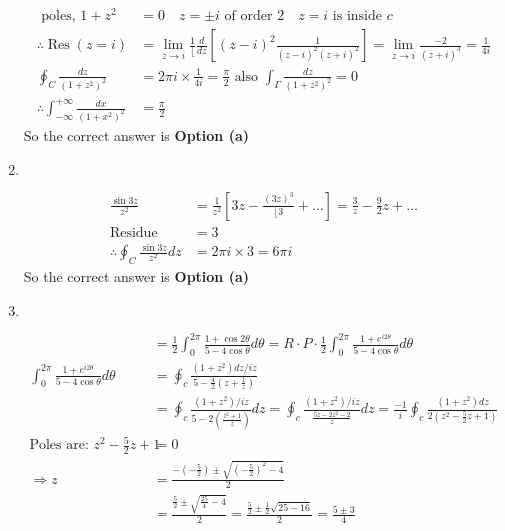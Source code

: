 \begin{enumerate}
\begin{answer}
\begin{align*}
	\text{	poles, }1+z^{2}&=0 \quad z=\pm i\text{ of order $2 \quad z=i$ is inside } c\\
	\therefore \operatorname{Res}(z=i)&=\lim _{z \rightarrow i} \frac{1}{\lfloor} \frac{d}{d z}\left[(z-i)^{2} \frac{1}{(z-i)^{2}(z+i)^{2}}\right]=\lim _{z \rightarrow i} \frac{-2}{(z+i)^{3}}=\frac{1}{4 i}\\
	\oint_{C} \frac{d z}{\left(1+z^{2}\right)^{2}}&=2 \pi i \times \frac{1}{4 i}=\frac{\pi}{2}\text{ also }\int_{\Gamma} \frac{d z}{\left(1+z^{2}\right)^{2}}=0\\
	\therefore \int_{-\infty}^{+\infty} \frac{d x}{\left(1+x^{2}\right)^{2}}&=\frac{\pi}{2}
	\end{align*}
	So the correct answer is \textbf{Option (a)}
\end{answer}
\item $\left. \right. $
\begin{answer}
	\begin{align*}
	\frac{\sin 3 z}{z^{2}}&=\frac{1}{z^{2}}\left[3 z-\frac{(3 z)^{3}}{\lfloor 3}+\ldots\right]=\frac{3}{z}-\frac{9}{2} z+\ldots\\
	\text{Residue }&=3\\
	\therefore \oint_{C} \frac{\sin 3 z}{z^{2}} d z&=2 \pi i \times 3=6 \pi i
	\end{align*}
	So the correct answer is \textbf{Option (a)}
\end{answer}
\item $\left. \right. $
\begin{answer}
	\begin{align*}
	&=\frac{1}{2} \int_{0}^{2 \pi} \frac{1+\cos 2 \theta}{5-4 \cos \theta} d \theta=R \cdot P \cdot \frac{1}{2} \int_{0}^{2 \pi} \frac{1+e^{i 2 \theta}}{5-4 \cos \theta} d \theta\\
	\int_{0}^{2 \pi} \frac{1+e^{i 2 \theta}}{5-4 \cos \theta} d \theta&=\oint_{c} \frac{\left(1+z^{2}\right) d z / i z}{5-\frac{4}{2}\left(z+\frac{1}{z}\right)}\\
	&=\oint_{c} \frac{\left(1+z^{2}\right) / i z}{5-2\left(\frac{z^{2}+1}{z}\right)} d z=\oint_{c} \frac{\left(1+z^{2}\right) / i z}{\frac{5 z-2 z^{2}-2}{z}} d z=\frac{-1}{i} \oint_{c} \frac{\left(1+z^{2}\right) d z}{2\left(z^{2}-\frac{5}{2} z+1\right)}\\
	\text{Poles are: }z^{2}-\frac{5}{2} z+1&=0\\
	\Rightarrow z&=\frac{-\left(-\frac{5}{2}\right) \pm \sqrt{\left(-\frac{5}{2}\right)^{2}-4}}{2}\\
	&=\frac{\frac{5}{2} \pm \sqrt{\frac{25}{4}-4}}{2}=\frac{\frac{5}{2} \pm \frac{1}{2} \sqrt{25-16}}{2}=\frac{5 \pm 3}{4}\\

\end{align*}
\end{answer}
\end{enumerate}
